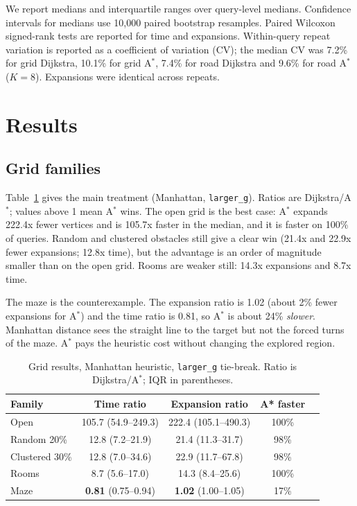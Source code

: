 \documentclass[conference,10pt]{IEEEtran}
\newcommand{\Astar}{A$^\ast$}
\newcommand{\code}[1]{\texttt{#1}}
\begin{document}
We report medians and interquartile ranges over query-level medians.  Confidence
intervals for medians use 10,000 paired bootstrap resamples.  Paired Wilcoxon
signed-rank tests are reported for time and expansions.  Within-query repeat
variation is reported as a coefficient of variation (CV); the median CV was
7.2\% for grid Dijkstra, 10.1\% for grid \Astar{}, 7.4\% for road Dijkstra and
9.6\% for road \Astar{} ($K=8$).  Expansions were identical across repeats.

\section{Results}
\label{sec:results}

\subsection{Grid families}
Table~\ref{tab:grid} gives the main treatment (Manhattan, \code{larger\_g}).
Ratios are Dijkstra/\Astar{}; values above 1 mean \Astar{} wins.  The open grid
is the best case: \Astar{} expands 222.4x fewer vertices and is 105.7x faster in
the median, and it is faster on 100\% of queries.  Random and clustered
obstacles still give a clear win (21.4x and 22.9x fewer expansions; 12.8x time),
but the advantage is an order of magnitude smaller than on the open grid.
Rooms are weaker still: 14.3x expansions and 8.7x time.

The maze is the counterexample.  The expansion ratio is 1.02 (about 2\% fewer
expansions for \Astar{}) and the time ratio is 0.81, so \Astar{} is about 24\%
\emph{slower}.  Manhattan distance sees the straight line to the target but not
the forced turns of the maze.  \Astar{} pays the heuristic cost without changing
the explored region.

\begin{table}[!t]
\centering
\caption{Grid results, Manhattan heuristic, \code{larger\_g} tie-break.  Ratio
is Dijkstra/\Astar{}; IQR in parentheses.}
\label{tab:grid}
\footnotesize
\setlength{\tabcolsep}{2.5pt}
\begin{tabular}{lcccc}
\toprule
Family & Time ratio & Expansion ratio & A* faster\\
\midrule
Open & 105.7 (54.9--249.3) & 222.4 (105.1--490.3) & 100\%\\
Random 20\% & 12.8 (7.2--21.9) & 21.4 (11.3--31.7) & 98\%\\
Clustered 30\% & 12.8 (7.0--34.6) & 22.9 (11.7--67.8) & 98\%\\
Rooms & 8.7 (5.6--17.0) & 14.3 (8.4--25.6) & 100\%\\
Maze & \textbf{0.81} (0.75--0.94) & \textbf{1.02} (1.00--1.05) & 17\%\\
\bottomrule
\end{tabular}
\end{table}
\end{document}
